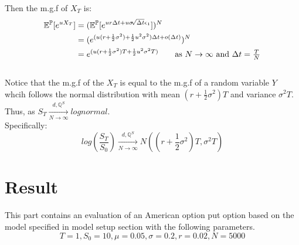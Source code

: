 \documentclass[12pt]{article}
\begin{document}
Then the m.g.f of $X_T$ is:
\begin{align*}
  \mathbb{E}^\mathbb{P}[e^{u X_T}] &= (\mathbb{E}^\mathbb{P} [e^{u r\Delta t+u\sigma \sqrt[]{\Delta t} \epsilon_1}])^N \\
  &= (e^{(u(r+\frac{1}{2}\sigma^2) + \frac{1}{2}u^2\sigma^2) \Delta t + o(\Delta t)})^N\\
  &= e^{(u(r + \frac{1}{2}\sigma^2)T + \frac{1}{2}u^2 \sigma^2T)} \tag*{as $N \rightarrow \infty$ and $\Delta t = \frac{T}{N}$}
\end{align*}
\\
Notice that the m.g.f of the $X_T$ is equal to the m.g.f of a random variable $Y$ whcih follows the normal distribution with mean $(r + \frac{1}{2}\sigma^2)T$ and
variance $\sigma^2 T$. Thus, as $S_T  \xrightarrow[N \rightarrow \infty]{d, \mathbb{Q}^S} lognormal$.\\
Specifically: 
\[ log(\frac{S_T}{S_0})  \xrightarrow[N \rightarrow \infty]{d, \mathbb{Q}^S} N((r + \frac{1}{2}\sigma^2)T,\sigma^2 T) \]


\section{Result}
This part contains an evaluation of an American option put option based on the model specified in model setup section with the 
following parameters.
$$ T = 1, S_0 =10, \mu = 0.05, \sigma = 0.2, r=0.02, N = 5000$$
\end{document}
